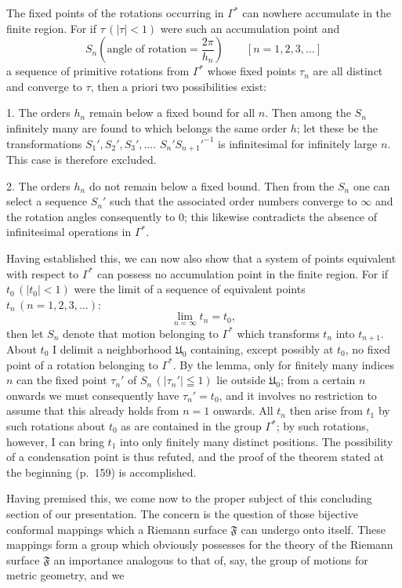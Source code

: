 \documentclass{article}
\begin{document}
The fixed points of the rotations occurring in $\varGamma^*$ can nowhere accumulate in the finite region. For if $\tau\,(|\tau| < 1)$ were such an accumulation point and
\[ S_n \left( \text{angle of rotation} = \frac{2\pi}{h_n} \right) \qquad [n = 1, 2, 3, \dots] \]
a sequence of primitive rotations from $\varGamma^*$ whose fixed points $\tau_n$ are all distinct and converge to $\tau$, then a priori two possibilities exist:

1. The orders $h_n$ remain below a fixed bound for all $n$. Then among the $S_n$ infinitely many are found to which belongs the same order $h$; let these be the transformations $S_1', S_2', S_3', \dots$. $S_n' S_{n+1}'^{-1}$ is infinitesimal for infinitely large $n$. This case is therefore excluded.

2. The orders $h_n$ do not remain below a fixed bound. Then from the $S_n$ one can select a sequence $S_n'$ such that the associated order numbers converge to $\infty$ and the rotation angles consequently to $0$; this likewise contradicts the absence of infinitesimal operations in $\varGamma^*$.

Having established this, we can now also show that a system of points equivalent with respect to $\varGamma^*$ can possess no accumulation point in the finite region. For if $t_0\,(|t_0| < 1)$ were the limit of a sequence of equivalent points $t_n\,(n = 1, 2, 3, \dots)\colon$
\[ \lim_{n = \infty} t_n = t_0, \]
then let $S_n$ denote that motion belonging to $\varGamma^*$ which transforms $t_n$ into $t_{n+1}$. About $t_0$ I delimit a neighborhood $\mathfrak{U}_0$ containing, except possibly at $t_0$, no fixed point of a rotation belonging to $\varGamma^*$. By the lemma, only for finitely many indices $n$ can the fixed point $\tau_n'$ of $S_n\,(|\tau_n'| \leqq 1)$ lie outside $\mathfrak{U}_0$; from a certain $n$ onwards we must consequently have $\tau_n' = t_0$, and it involves no restriction to assume that this already holds from $n = 1$ onwards. All $t_n$ then arise from $t_1$ by such rotations about $t_0$ as are contained in the group $\varGamma^*$; by such rotations, however, I can bring $t_1$ into only finitely many distinct positions. The possibility of a condensation point is thus refuted, and the proof of the theorem stated at the beginning (p.~159) is accomplished.

Having premised this, we come now to the proper subject of this concluding section of our presentation. The concern is the question of those bijective conformal mappings which a Riemann surface $\mathfrak{F}$ can undergo onto itself. These mappings form a group which obviously possesses for the theory of the Riemann surface $\mathfrak{F}$ an importance analogous to that of, say, the group of motions for metric geometry, and we
\end{document}
